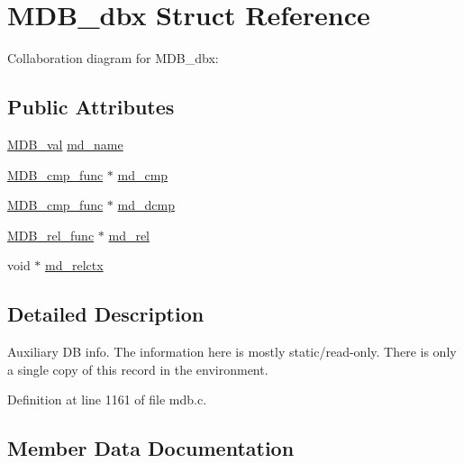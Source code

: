 \hypertarget{struct_m_d_b__dbx}{}\section{M\+D\+B\+\_\+dbx Struct Reference}
\label{struct_m_d_b__dbx}


Collaboration diagram for M\+D\+B\+\_\+dbx\+:
\subsection*{Public Attributes}
\begin{DoxyCompactItemize}
\item 
\mbox{\hyperlink{struct_m_d_b__val}{M\+D\+B\+\_\+val}} \mbox{\hyperlink{struct_m_d_b__dbx_afcb04fa7b107cf82bd68a4ad8e8ff17b}{md\+\_\+name}}
\item 
\mbox{\hyperlink{group__mdb_gac1ea382293d1da331ab88ca59052847d}{M\+D\+B\+\_\+cmp\+\_\+func}} $\ast$ \mbox{\hyperlink{struct_m_d_b__dbx_a1fd5cb703a4d606423c30c01d705cd53}{md\+\_\+cmp}}
\item 
\mbox{\hyperlink{group__mdb_gac1ea382293d1da331ab88ca59052847d}{M\+D\+B\+\_\+cmp\+\_\+func}} $\ast$ \mbox{\hyperlink{struct_m_d_b__dbx_a79e8f44261045d7390fe69620e31e917}{md\+\_\+dcmp}}
\item 
\mbox{\hyperlink{group__mdb_ga311e8b7d73c5e7c03b625a894c5014cb}{M\+D\+B\+\_\+rel\+\_\+func}} $\ast$ \mbox{\hyperlink{struct_m_d_b__dbx_a5a507a8a31ca1cec34393e4966765572}{md\+\_\+rel}}
\item 
void $\ast$ \mbox{\hyperlink{struct_m_d_b__dbx_a284dafb1b3df0d8b701d9cb72875fb95}{md\+\_\+relctx}}
\end{DoxyCompactItemize}


\subsection{Detailed Description}
Auxiliary DB info. The information here is mostly static/read-\/only. There is only a single copy of this record in the environment. 

Definition at line 1161 of file mdb.\+c.



\subsection{Member Data Documentation}
\mbox{\label{struct_m_d_b__dbx_a1fd5cb703a4d606423c30c01d705cd53}} 
